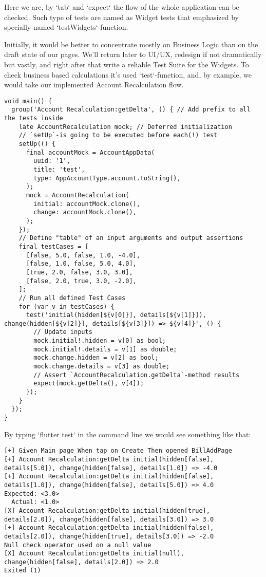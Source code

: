 Here we are, by `tab` and `expect` the flow of the whole application can be checked. Such type of tests are named as 
Widget tests that emphasized by specially named `testWidgets`-function.

Initially, it would be better to concentrate mostly on Business Logic than on the draft state of our pages. We'll 
return later to UI/UX, redesign if not dramatically but vastly, and right after that write a reliable 
Test Suite for the Widgets. To check business based calculations it's used `test`-function, and, by example, we would
take our implemented Account Recalculation flow.

\begin{lstlisting}
void main() {
  group('Account Recalculation:getDelta', () { // Add prefix to all the tests inside
    late AccountRecalculation mock; // Deferred initialization 
    // `setUp`-is going to be executed before each(!) test
    setUp(() {
      final accountMock = AccountAppData(
        uuid: '1',
        title: 'test',
        type: AppAccountType.account.toString(),
      );
      mock = AccountRecalculation(
        initial: accountMock.clone(),
        change: accountMock.clone(),
      );
    });
    // Define "table" of an input arguments and output assertions
    final testCases = [
      [false, 5.0, false, 1.0, -4.0],
      [false, 1.0, false, 5.0, 4.0],
      [true, 2.0, false, 3.0, 3.0],
      [false, 2.0, true, 3.0, -2.0],
    ];
    // Run all defined Test Cases
    for (var v in testCases) {
      test('initial(hidden[${v[0]}], details[${v[1]}]), change(hidden[${v[2]}], details[${v[3]}]) => ${v[4]}', () {
        // Update inputs
        mock.initial!.hidden = v[0] as bool;
        mock.initial!.details = v[1] as double;
        mock.change.hidden = v[2] as bool;
        mock.change.details = v[3] as double;
        // Assert `AccountRecalculation.getDelta`-method results
        expect(mock.getDelta(), v[4]); 
      });
    }
  });
}
\end{lstlisting}

By typing `flutter test` in the command line we would see something like that:

\begin{lstlisting}
[+] Given Main page When tap on Create Then opened BillAddPage
[+] Account Recalculation:getDelta initial(hidden[false], details[5.0]), change(hidden[false], details[1.0]) => -4.0
[+] Account Recalculation:getDelta initial(hidden[false], details[1.0]), change(hidden[false], details[5.0]) => 4.0
Expected: <3.0>
  Actual: <1.0>
[X] Account Recalculation:getDelta initial(hidden[true], details[2.0]), change(hidden[false], details[3.0]) => 3.0
[+] Account Recalculation:getDelta initial(hidden[false], details[2.0]), change(hidden[true], details[3.0]) => -2.0
Null check operator used on a null value
[X] Account Recalculation:getDelta initial(null), change(hidden[false], details[2.0]) => 2.0
Exited (1)
\end{lstlisting}

